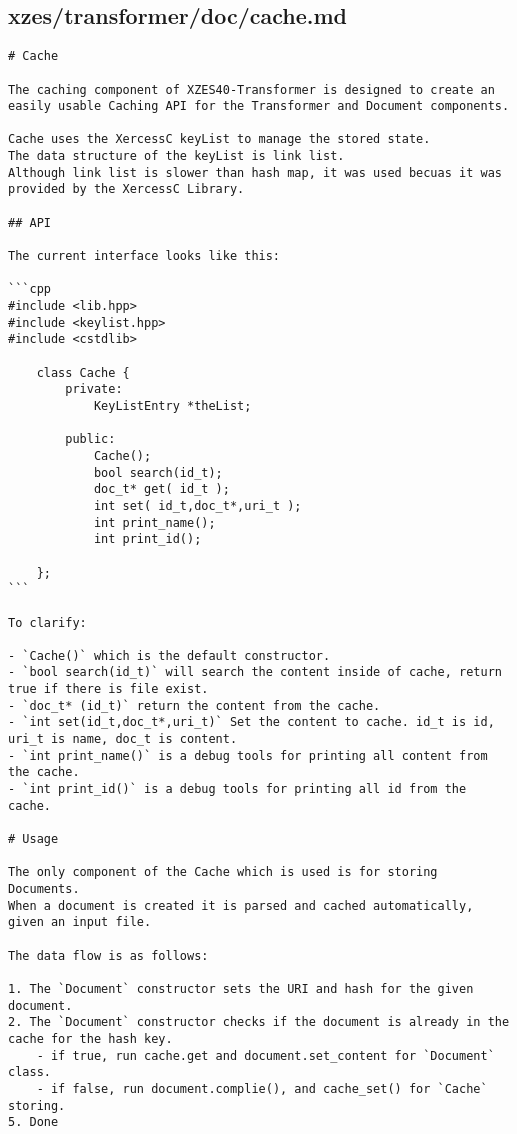 \subsection{xzes/transformer/doc/cache.md}
\begin{lstlisting}
# Cache

The caching component of XZES40-Transformer is designed to create an easily usable Caching API for the Transformer and Document components.

Cache uses the XercessC keyList to manage the stored state.
The data structure of the keyList is link list.
Although link list is slower than hash map, it was used becuas it was provided by the XercessC Library.

## API

The current interface looks like this:

```cpp
#include <lib.hpp>
#include <keylist.hpp>
#include <cstdlib>

	class Cache {
        private:
        	KeyListEntry *theList;

        public:
        	Cache();
            bool search(id_t);
            doc_t* get( id_t );
            int set( id_t,doc_t*,uri_t );
            int print_name();
            int	print_id();

    };
```

To clarify:

- `Cache()` which is the default constructor.
- `bool search(id_t)` will search the content inside of cache, return true if there is file exist.
- `doc_t* (id_t)` return the content from the cache.
- `int set(id_t,doc_t*,uri_t)` Set the content to cache. id_t is id, uri_t is name, doc_t is content.
- `int print_name()` is a debug tools for printing all content from the cache.
- `int print_id()` is a debug tools for printing all id from the cache.

# Usage

The only component of the Cache which is used is for storing Documents.
When a document is created it is parsed and cached automatically, given an input file.

The data flow is as follows:

1. The `Document` constructor sets the URI and hash for the given document.
2. The `Document` constructor checks if the document is already in the cache for the hash key.
    - if true, run cache.get and document.set_content for `Document` class.
    - if false, run document.complie(), and cache_set() for `Cache` storing.
5. Done
\end{lstlisting}
